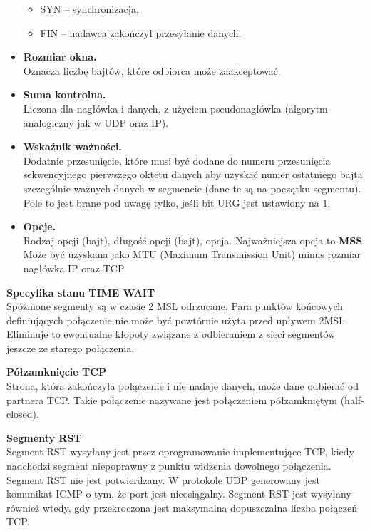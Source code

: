 \documentclass[a4paper]{article}
\begin{document}
\begin{itemize}
\begin{itemize}
        \item SYN – synchronizacja,
        \item FIN – nadawca zakończył przesyłanie danych.
    \end{itemize}
    \item \textbf{Rozmiar okna.}\\
     Oznacza liczbę bajtów, które odbiorca może zaakceptować.
     \item \textbf{Suma kontrolna.}\\
      Liczona dla nagłówka i danych, z użyciem pseudonagłówka (algorytm
analogiczny jak w UDP oraz IP).
    \item \textbf{Wskaźnik ważności.}\\
     Dodatnie przesunięcie, które musi być dodane do numeru przesunięcia
sekwencyjnego pierwszego oktetu danych aby uzyskać numer ostatniego bajta szczególnie
ważnych danych w segmencie (dane te są na początku segmentu). Pole to jest brane pod
uwagę tylko, jeśli bit URG jest ustawiony na 1.
    \item \textbf{Opcje.}\\
     Rodzaj opcji (bajt), długość opcji (bajt), opcja. Najważniejsza opcja to \textbf{MSS}. Może być uzyskana jako MTU (Maximum Transmission Unit) minus rozmiar nagłówka IP oraz TCP.
\end{itemize}

\textbf{Specyfika stanu TIME WAIT}\\
Spóźnione segmenty są w czasie 2 MSL odrzucane. Para
punktów końcowych definiujących połączenie nie może być powtórnie użyta przed upływem
2MSL. Eliminuje to ewentualne kłopoty związane z odbieraniem z sieci segmentów jeszcze ze
starego połączenia.

\textbf{Półzamknięcie TCP}\\
Strona, która zakończyła połączenie i nie nadaje danych, może dane odbierać od partnera
TCP. Takie połączenie nazywane jest połączeniem półzamkniętym (half-closed).

\textbf{Segmenty RST}\\
Segment RST wysyłany jest przez oprogramowanie implementujące TCP, kiedy nadchodzi
segment niepoprawny z punktu widzenia dowolnego połączenia. Segment RST nie jest potwierdzany. W protokole UDP generowany jest komunikat ICMP o tym, że port jest nieosiągalny.
Segment RST jest wysyłany również wtedy, gdy przekroczona jest maksymalna dopuszczalna
liczba połączeń TCP.
\end{document}
